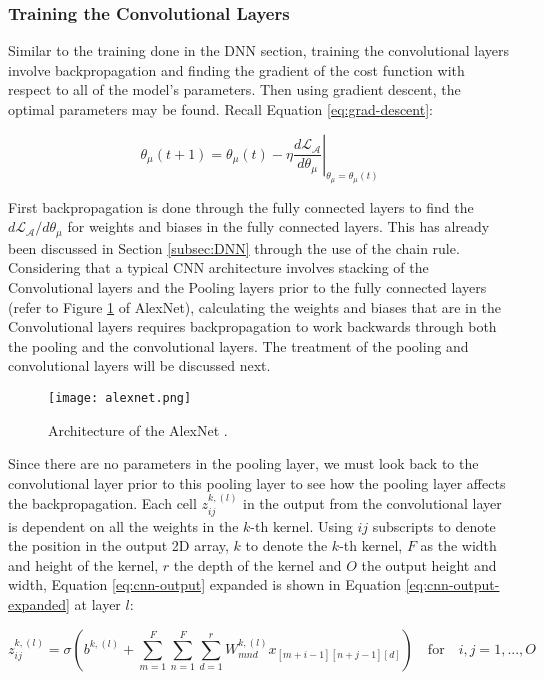 \subsubsection{Training the Convolutional Layers}
Similar to the training done in the DNN section, training the convolutional layers involve backpropagation and finding the gradient of the cost function with respect to all of the model's parameters. Then using gradient descent, the optimal parameters may be found. Recall Equation \ref{eq:grad-descent}:

\begin{equation}
    \theta_\mu(t+1) = \theta_\mu(t) - \eta \left. {\frac{d\mathcal{L}_\mathcal{A}}{d\theta_\mu}}\right|_{\theta_\mu = \theta_\mu(t)}
\end{equation} 

First backpropagation is done through the fully connected layers to find the $d\mathcal{L}_\mathcal{A}/d\theta_\mu$ for weights and biases in the fully connected layers. This has already been discussed in Section \ref{subsec:DNN} through the use of the chain rule. Considering that a typical CNN architecture involves stacking of the Convolutional layers and the Pooling layers prior to the fully connected layers (refer to Figure \ref{fig:alexnet} of AlexNet), calculating the weights and biases that are in the Convolutional layers requires backpropagation to work backwards through both the pooling and the convolutional layers. The treatment of the pooling and convolutional layers will be discussed next.

\begin{figure}[ht]
    \centering
    \texttt{[image: alexnet.png]}
    \caption{Architecture of the AlexNet \cite{vasudevUnderstandingCalculatingNumber2020}.}
    \label{fig:alexnet}
\end{figure}


Since there are no parameters in the pooling layer, we must look back to the convolutional layer prior to this pooling layer to see how the pooling layer affects the backpropagation. Each cell $z_{ij}^{k, (l)}$ in the output from the convolutional layer is dependent on all the weights in the $k$-th kernel. Using $ij$ subscripts to denote the position in the output 2D array, $k$ to denote the $k$-th kernel, $F$ as the width and height of the kernel, $r$ the depth of the kernel and $O$ the output height and width, Equation \ref{eq:cnn-output} expanded is shown in Equation \ref{eq:cnn-output-expanded} at layer $l$:

\begin{equation}
    \label{eq:cnn-output-expanded}
    z_{ij}^{k, (l)} = \sigma\left(b^{k, (l)} + \sum_{m=1}^{F} \sum_{n=1}^{F} \sum_{d=1}^{r}W^{k, (l)}_{mnd}x_{[m+i-1][n+j-1][d]}\right) \quad \text{for} \quad i,j = 1,...,O
\end{equation}

